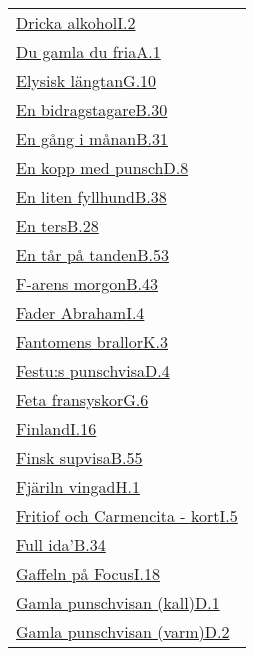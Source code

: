 \begin{longtable}[h]{@{}p{\linewidth}@{}}
  \hyperref[drickaalkohol]{Dricka alkohol}\dotfill\hyperref[drickaalkohol]{I.2}\\
  \hyperref[dugamla]{Du gamla du fria}\dotfill\hyperref[dugamla]{A.1}\\
  \hyperref[elysisklangtan]{Elysisk längtan}\dotfill\hyperref[elysisklangtan]{G.10}\\
  \hyperref[bidragstagare]{En bidragstagare}\dotfill\hyperref[bidragstagare]{B.30}\\
  \hyperref[engangimanan]{En gång i månan}\dotfill\hyperref[engangimanan]{B.31}\\
  \hyperref[enkoppmedpunsch]{En kopp med punsch}\dotfill\hyperref[enkoppmedpunsch]{D.8}\\
  \hyperref[fyllhund]{En liten fyllhund}\dotfill\hyperref[fyllhund]{B.38}\\
  \hyperref[enters]{En ters}\dotfill\hyperref[enters]{B.28}\\
  \hyperref[entarpatanden]{En tår på tanden}\dotfill\hyperref[entarpatanden]{B.53}\\
  \hyperref[farensmorgon]{F-arens morgon}\dotfill\hyperref[farensmorgon]{B.43}\\
  \hyperref[faderabraham]{Fader Abraham}\dotfill\hyperref[faderabraham]{I.4}\\
  \hyperref[fantomensbrallor]{Fantomens brallor}\dotfill\hyperref[fantomensbrallor]{K.3}\\
  \hyperref[festu]{Festu:s punschvisa}\dotfill\hyperref[festu]{D.4}\\
  \hyperref[fetafransyskor]{Feta fransyskor}\dotfill\hyperref[fetafransyskor]{G.6}\\
  \hyperref[finland]{Finland}\dotfill\hyperref[finland]{I.16}\\
  \hyperref[finsksup]{Finsk supvisa}\dotfill\hyperref[finsksup]{B.55}\\
  \hyperref[fjarilnvingad]{Fjäriln vingad}\dotfill\hyperref[fjarilnvingad]{H.1}\\
  \hyperref[fritiof]{Fritiof och Carmencita - kort}\dotfill\hyperref[fritiof]{I.5}\\
  \hyperref[fullida]{Full ida'}\dotfill\hyperref[fullida]{B.34}\\
  \hyperref[gaffelnpafocus]{Gaffeln på Focus}\dotfill\hyperref[gaffelnpafocus]{I.18}\\
  \hyperref[gamlakall]{Gamla punschvisan (kall)}\dotfill\hyperref[gamlakall]{D.1}\\
  \hyperref[gamlavarm]{Gamla punschvisan (varm)}\dotfill\hyperref[gamlavarm]{D.2}\\

\end{longtable}

